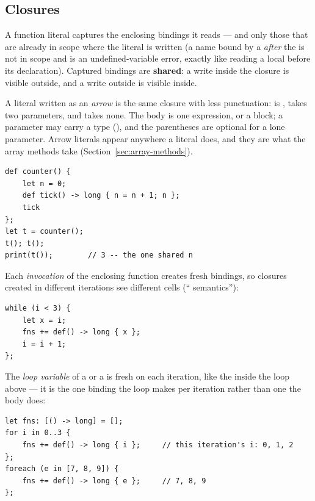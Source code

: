 \subsection{Closures}
\label{sec:closures}

A function literal captures the enclosing bindings it reads --- and only
those that are already in scope where the literal is written (a name
bound by a  \emph{after} the  is not in scope and is an
undefined-variable error, exactly like reading a local before its
declaration). Captured bindings are \textbf{shared}: a write inside the
closure is visible outside, and a write outside is visible inside.

A literal written as an \emph{arrow} is the same closure with less
punctuation:  is ,
 takes two parameters, and  takes none.
The body is one expression, or a block; a parameter may carry a type
(), and the parentheses are optional
for a lone parameter. Arrow literals appear anywhere a  literal
does, and they are what the array methods take
(Section~\ref{sec:array-methods}).

\begin{lstlisting}
def counter() {
    let n = 0;
    def tick() -> long { n = n + 1; n };
    tick
};
let t = counter();
t(); t();
print(t());        // 3 -- the one shared n
\end{lstlisting}

\noindent Each \emph{invocation} of the enclosing function creates fresh
bindings, so closures created in different iterations see different
cells (`` semantics''):

\begin{lstlisting}
while (i < 3) {
    let x = i;
    fns += def() -> long { x };
    i = i + 1;
};
\end{lstlisting}

\noindent The \emph{loop variable} of a  or a
 is fresh on each iteration, like the 
inside the loop above --- it is the one binding the loop makes per
iteration rather than one the body does:

\begin{lstlisting}
let fns: [() -> long] = [];
for i in 0..3 {
    fns += def() -> long { i };     // this iteration's i: 0, 1, 2
};
foreach (e in [7, 8, 9]) {
    fns += def() -> long { e };     // 7, 8, 9
};
\end{lstlisting}

